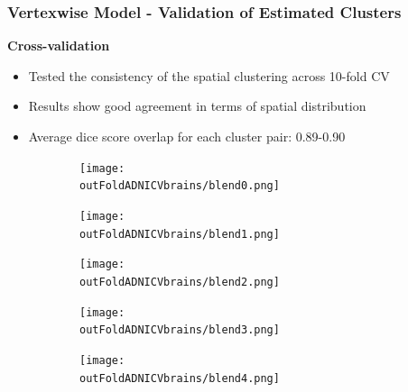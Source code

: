 \documentclass[10pt,xcolor=table]{beamer}
\begin{document}
\begin{frame}
\frametitle{Vertexwise Model - Validation of Estimated Clusters}

\newcommand{\outFoldADNICVbrains}{../../voxelwiseDPM/ipmi_paper/figures/crossvalid/adniThavgFWHM0Initk-meansCl3Pr0Ra1_VWDPMMean}

\newcommand{\scaleFig}{0.16}

\textbf{Cross-validation}
\begin{itemize}
 \item Tested the consistency of the spatial clustering across 10-fold CV
 \item Results show good agreement in terms of spatial distribution
 \item Average dice score overlap for each cluster pair: 0.89-0.90
\end{itemize}


\begin{figure}[h]
    \centering
    
    \begin{subfigure}[b]{\scaleFig\textwidth}\texttt{[image: \\outFoldADNICVbrains/blend0.png]}\end{subfigure}
    \begin{subfigure}[b]{\scaleFig\textwidth}\texttt{[image: \\outFoldADNICVbrains/blend1.png]}\end{subfigure}
    \begin{subfigure}[b]{\scaleFig\textwidth}\texttt{[image: \\outFoldADNICVbrains/blend2.png]}\end{subfigure}
    \begin{subfigure}[b]{\scaleFig\textwidth}\texttt{[image: \\outFoldADNICVbrains/blend3.png]}\end{subfigure}
    \begin{subfigure}[b]{\scaleFig\textwidth}\texttt{[image: \\outFoldADNICVbrains/blend4.png]}\end{subfigure}
    

\end{figure}
\end{frame}
\end{document}

